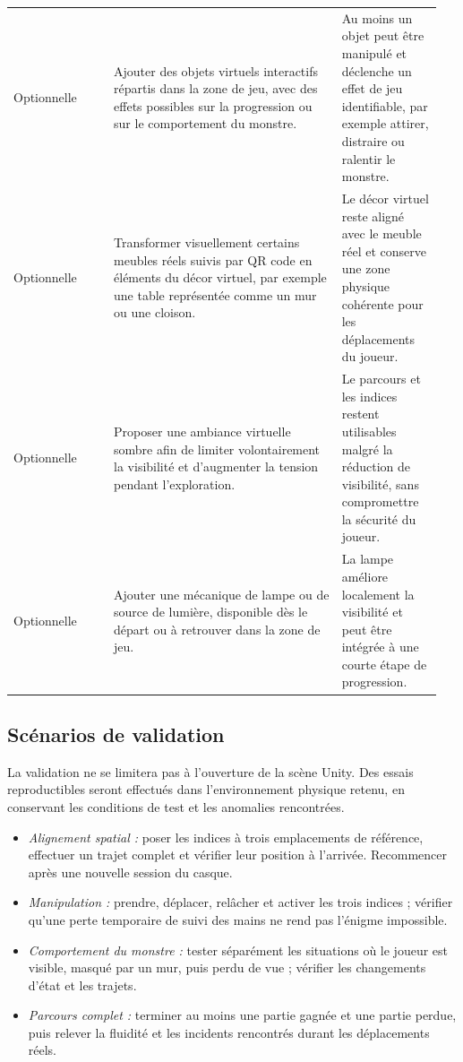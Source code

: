 \documentclass[11pt,a4paper]{article}
\newcommand{\optional}{\textcolor{priorityLow}{Optionnelle}}
\begin{document}
{\begin{longtable}{@{}L{0.222\linewidth}L{0.50\linewidth}L{0.224\linewidth}@{}}
\optional & Ajouter des objets virtuels interactifs répartis dans la zone de jeu, avec des effets possibles sur la progression ou sur le comportement du monstre. & Au moins un objet peut être manipulé et déclenche un effet de jeu identifiable, par exemple attirer, distraire ou ralentir le monstre. \\
\addlinespace[0.25em]
\optional & Transformer visuellement certains meubles réels suivis par QR code en éléments du décor virtuel, par exemple une table représentée comme un mur ou une cloison. & Le décor virtuel reste aligné avec le meuble réel et conserve une zone physique cohérente pour les déplacements du joueur. \\
\addlinespace[0.25em]
\optional & Proposer une ambiance virtuelle sombre afin de limiter volontairement la visibilité et d'augmenter la tension pendant l'exploration. & Le parcours et les indices restent utilisables malgré la réduction de visibilité, sans compromettre la sécurité du joueur. \\
\addlinespace[0.25em]
\optional & Ajouter une mécanique de lampe ou de source de lumière, disponible dès le départ ou à retrouver dans la zone de jeu. & La lampe améliore localement la visibilité et peut être intégrée à une courte étape de progression. \\
\bottomrule
\end{longtable}
}

\subsection{Scénarios de validation}

La validation ne se limitera pas à l'ouverture de la scène Unity. Des essais reproductibles seront effectués dans l'environnement physique retenu, en conservant les conditions de test et les anomalies rencontrées.

\begin{itemize}
    \item \emph{Alignement spatial :} poser les indices à trois emplacements de référence, effectuer un trajet complet et vérifier leur position à l'arrivée. Recommencer après une nouvelle session du casque.
    \item \emph{Manipulation :} prendre, déplacer, relâcher et activer les trois indices ; vérifier qu'une perte temporaire de suivi des mains ne rend pas l'énigme impossible.
    \item \emph{Comportement du monstre :} tester séparément les situations où le joueur est visible, masqué par un mur, puis perdu de vue ; vérifier les changements d'état et les trajets.
    \item \emph{Parcours complet :} terminer au moins une partie gagnée et une partie perdue, puis relever la fluidité et les incidents rencontrés durant les déplacements réels.
\end{itemize}
\end{document}
